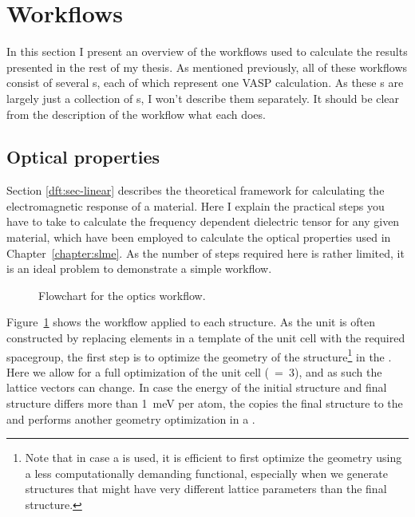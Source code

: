 \begin{refsection}
\begin{itemize}
\end{itemize} 
 
\section{Workflows} \label{automation:sec-workflows} 
 
In this section I present an overview of the workflows used to calculate the 
results presented in the rest of my thesis. As mentioned previously, all of 
these workflows consist of several s, each of which represent 
one VASP calculation. As these s are largely just a 
collection of s, I won't describe them separately. It should be 
clear from the description of the workflow what each  does. 
 
\subsection{Optical properties} \label{automation:sec-optics} 
 
Section \ref{dft:sec-linear} describes the theoretical framework for 
calculating the electromagnetic response of a material. Here I explain the 
practical steps you have to take to calculate the frequency dependent 
dielectric tensor for any given material, which have been employed to 
calculate the optical properties used in Chapter~\ref{chapter:slme}. As the 
number of steps required here is rather limited, it is an ideal problem to 
demonstrate a simple workflow. 
 
\begin{figure}[ht] 
 
\caption{\label{automation:fig-optics} Flowchart for the optics workflow.} 
\end{figure} 
 
Figure~\ref{automation:fig-optics} shows the workflow applied to each 
structure. As the unit is often constructed by replacing elements in a 
template of the unit cell with the required spacegroup, the first step is to 
optimize the geometry of the structure\footnote{Note that in case a 
 is used, it is efficient to first 
optimize the geometry using a less computationally demanding functional, 
especially when we generate structures that might have very different lattice 
parameters than the final structure.} in the . Here we allow 
for a full optimization of the unit cell (~=~3), and as such the 
lattice vectors can change. In case the energy of the initial structure and 
final structure differs more than 1~\si{\milli\electronvolt} per atom, the 
 copies the final structure 
 to the  and performs another geometry optimization 
in a . 
 

\end{refsection}
